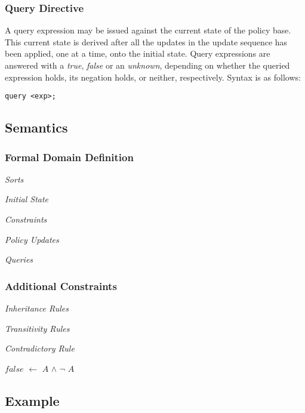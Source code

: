 \documentclass[10pt, twocolumn]{article}
\begin{document}
      \subsubsection{Query Directive}

        A query expression may be issued against the current state of the
        policy base. This current state is derived after all the updates in
        the update sequence has been applied, one at a time, onto the initial
        state. Query expressions are answered with a \emph{true}, \emph{false}
        or an \emph{unknown}, depending on whether the queried expression
        holds, its negation holds, or neither, respectively. Syntax is as
        follows:

        \begin{verbatim}query <exp>;\end{verbatim} 

    \subsection{Semantics}

      \subsubsection{Formal Domain Definition}

        \noindent \emph{Sorts}

        \noindent \emph{Initial State}

        \noindent \emph{Constraints}

        \noindent \emph{Policy Updates}

        \noindent \emph{Queries}

      \subsubsection{Additional Constraints}

        \noindent \emph{Inheritance Rules}

        \noindent \emph{Transitivity Rules}

        \noindent \emph{Contradictory Rule}

          $false$ $\leftarrow$ $A$ $\land$ $\lnot$ $A$

    \subsection{Example}
\end{document}
